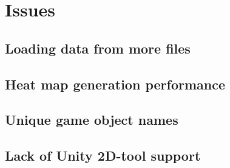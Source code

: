 \section{Issues}
\label{Issues}

\subsection{Loading data from more files}
\label{Issues_MoreFiles}
\subsection{Heat map generation performance}
\label{Issues_generationPerformance}
\subsection{Unique game object names}
\label{Issues_UniqueNames}
\subsection{Lack of Unity 2D-tool support}
\label{Issues_2DSupport}